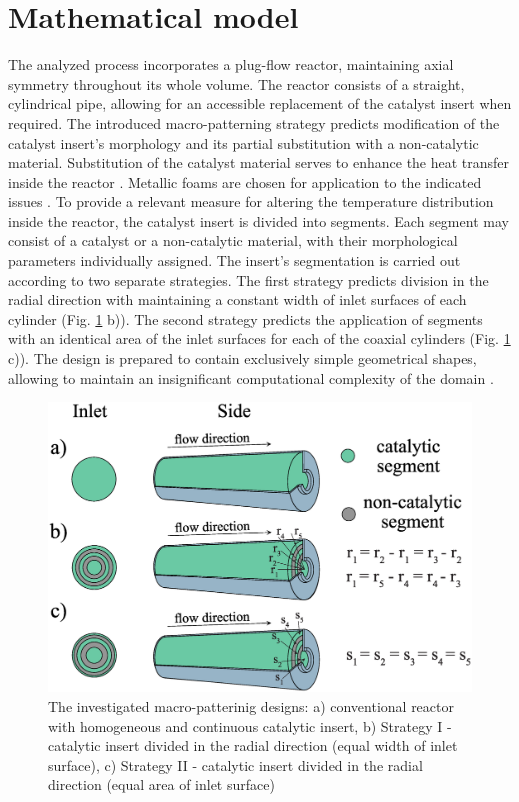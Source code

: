 \documentclass[preprint,12pt]{elsarticle}
\begin{document}
\section{Mathematical model}
\label{sec:math_model}

The analyzed process incorporates a plug-flow reactor, maintaining axial symmetry throughout its whole volume. The reactor consists of a straight, cylindrical pipe, allowing for an accessible replacement of the catalyst insert when required.  The introduced macro-patterning strategy predicts modification of the catalyst insert's morphology and its partial substitution with a non-catalytic material. Substitution of the catalyst material serves to enhance the heat transfer inside the reactor \cite{Pajak2018}. Metallic foams are chosen for application to the indicated issues \cite{Boomsma2003}. To provide a relevant measure for altering the temperature distribution inside the reactor, the catalyst insert is divided into segments. Each segment may consist of a catalyst or a non-catalytic material, with their morphological parameters individually assigned. The insert's segmentation is carried out according to two separate strategies. The first strategy predicts division in the radial direction with maintaining a constant width of inlet surfaces of each cylinder (Fig. \ref{fig:segments} b)). The second strategy predicts the application of segments with an identical area of the inlet surfaces for each of the coaxial cylinders (Fig. \ref{fig:segments} c)). The design is prepared to contain exclusively simple geometrical shapes, allowing to maintain an insignificant computational complexity of the domain \cite{Kaw2011}.  

\begin{figure}[h]
\centering
\includegraphics[width=120mm]{segments.eps}\hspace{2pc} 
\caption{\label{fig:segments} The investigated macro-patterinig designs: a) conventional reactor with homogeneous and continuous catalytic insert, b) Strategy I - catalytic insert divided in the radial direction (equal width of inlet surface),  c) Strategy II - catalytic insert divided in the radial direction  (equal area of inlet surface)}
\end{figure}
 
\end{document}

